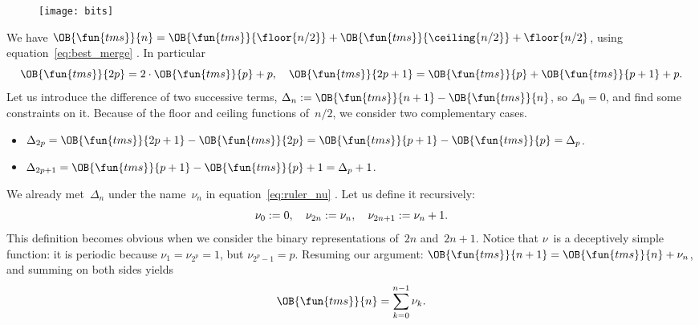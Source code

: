 {\setlength{\intextsep}{0pt} %
\begin{wrapfigure}[22]{r}[0pt]{0pt}
\centering
\texttt{[image: bits]}
\caption{}
\label{fig:bits}
\end{wrapfigure}
We have \(\OB{\fun{tms}}{n} = \OB{\fun{tms}}{\floor{n/2}} +
\OB{\fun{tms}}{\ceiling{n/2}} + \floor{n/2}\), using
equation~\eqref{eq:best_merge}
. In particular
\begin{equation*}
\OB{\fun{tms}}{2p} = 2 \cdot \OB{\fun{tms}}{p} + p,\quad
\OB{\fun{tms}}{2p+1} = \OB{\fun{tms}}{p} + \OB{\fun{tms}}{p+1} + p.
\end{equation*}
Let us introduce the difference of two successive terms, \(\Delta_n :=
\OB{\fun{tms}}{n+1} - \OB{\fun{tms}}{n}\), so \(\Delta_0 = 0\), and
find some constraints on it. Because of the floor and ceiling
functions of~\(n/2\), we consider two complementary cases.
\begin{itemize}

 \item \(\Delta_{2p} = \OB{\fun{tms}}{2p+1} - \OB{\fun{tms}}{2p} =
  \OB{\fun{tms}}{p+1} - \OB{\fun{tms}}{p} = \Delta_{p}\).

  \item \(\Delta_{2p+1} = \OB{\fun{tms}}{p+1} - \OB{\fun{tms}}{p} + 1 =
  \Delta_{p} + 1\).

\end{itemize}
We already met~\(\Delta_n\) under the name~\(\nu_n\) in
equation~\eqref{eq:ruler_nu} . Let us define it
recursively:%
\begin{equation}
\nu_{0} := 0,\quad \nu_{2n} := \nu_{n},\quad
\nu_{2n+1} := \nu_{n} + 1.\label{def:nu}\index{bit sum}
\end{equation}
This definition becomes obvious when we consider the binary
representations of~\(2n\) and~\(2n+1\). Notice that \(\nu\)~is a
deceptively simple function: it is periodic because \(\nu_{1} =
\nu_{2^p} = 1\), but \(\nu_{2^p-1}=p\). Resuming our argument:
\(\OB{\fun{tms}}{n+1} = \OB{\fun{tms}}{n} + \nu_n\), and summing on
both sides yields
\begin{equation}
\abovedisplayskip=2pt
\abovedisplayshortskip=2pt
\belowdisplayskip=2pt
\OB{\fun{tms}}{n} = \sum_{k=0}^{n-1}{\nu_k}.\label{eq:OB_tms}
\index{tms@$\OB{\fun{tms}}{n}$}
\end{equation}}

